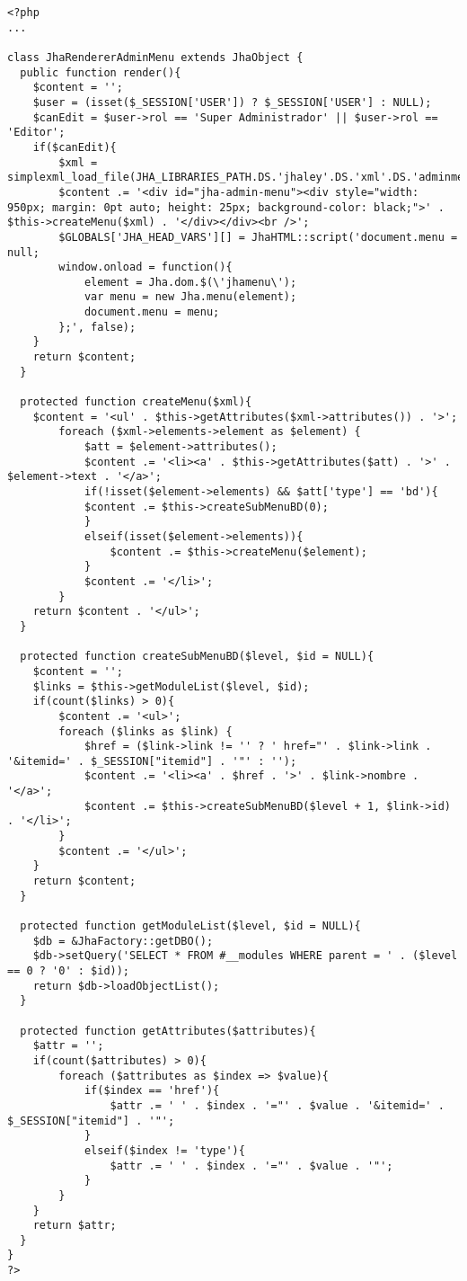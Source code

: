 \begin{lstlisting}[label=jha_renderer_head,caption=Renderizador para el tag HTML `head'.]
<?php
...

class JhaRendererAdminMenu extends JhaObject {
  public function render(){
  	$content = '';
    $user = (isset($_SESSION['USER']) ? $_SESSION['USER'] : NULL);
    $canEdit = $user->rol == 'Super Administrador' || $user->rol == 'Editor';
    if($canEdit){
    	$xml = simplexml_load_file(JHA_LIBRARIES_PATH.DS.'jhaley'.DS.'xml'.DS.'adminmenu.xml');
    	$content .= '<div id="jha-admin-menu"><div style="width: 950px; margin: 0pt auto; height: 25px; background-color: black;">' . $this->createMenu($xml) . '</div></div><br />';
    	$GLOBALS['JHA_HEAD_VARS'][] = JhaHTML::script('document.menu = null;
      	window.onload = function(){
    	    element = Jha.dom.$(\'jhamenu\');
    	    var menu = new Jha.menu(element);
    	    document.menu = menu;
        };', false);
    }
    return $content;
  }
  
  protected function createMenu($xml){
  	$content = '<ul' . $this->getAttributes($xml->attributes()) . '>';
 		foreach ($xml->elements->element as $element) {
 			$att = $element->attributes();
 			$content .= '<li><a' . $this->getAttributes($att) . '>' . $element->text . '</a>';
 			if(!isset($element->elements) && $att['type'] == 'bd'){
		    $content .= $this->createSubMenuBD(0);
 			}
 			elseif(isset($element->elements)){
 				$content .= $this->createMenu($element);
 			}
 			$content .= '</li>';
 		}
  	return $content . '</ul>';
  }
  
  protected function createSubMenuBD($level, $id = NULL){
  	$content = '';
  	$links = $this->getModuleList($level, $id);
  	if(count($links) > 0){
  		$content .= '<ul>';
    	foreach ($links as $link) {
    		$href = ($link->link != '' ? ' href="' . $link->link . '&itemid=' . $_SESSION["itemid"] . '"' : '');
    		$content .= '<li><a' . $href . '>' . $link->nombre . '</a>';
    		$content .= $this->createSubMenuBD($level + 1, $link->id) . '</li>';
    	}
    	$content .= '</ul>';
  	}
  	return $content;
  }
  
  protected function getModuleList($level, $id = NULL){
  	$db = &JhaFactory::getDBO();
  	$db->setQuery('SELECT * FROM #__modules WHERE parent = ' . ($level == 0 ? '0' : $id));
    return $db->loadObjectList();
  }
  
  protected function getAttributes($attributes){
  	$attr = '';
  	if(count($attributes) > 0){
  		foreach ($attributes as $index => $value){
  			if($index == 'href'){
  				$attr .= ' ' . $index . '="' . $value . '&itemid=' . $_SESSION["itemid"] . '"';
  			}
  			elseif($index != 'type'){
			    $attr .= ' ' . $index . '="' . $value . '"';
  			}
  		}
  	}
  	return $attr;
  }
}
?>
\end{lstlisting}

